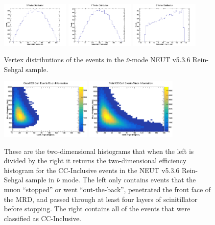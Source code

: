 \documentclass[11pt]{article}
\begin{document}
\begin{figure}[H]
\centering
\includegraphics[width=0.3\textwidth]{NewANMReinSehgalImages/4-XVertexDistributionANMRS.png}
\includegraphics[width=0.3\textwidth]{NewANMReinSehgalImages/3-YVertexDistributionANMRS.png}
\includegraphics[width=0.3\textwidth]{NewANMReinSehgalImages/2-ZVertexDistributionANMRS.png}
\caption{Vertex distributions of the events in the $\bar{\nu}$-mode NEUT v5.3.6 Rein-Sehgal sample.}
\label{fig:app:ANMVertexDistributionRS}
\end{figure}

\begin{figure}[H]
\centering
\includegraphics[width=0.4\textwidth]{NewANMReinSehgalImages/6-GoodCCCohMuonInfoANMRS.png}
\includegraphics[width=0.4\textwidth]{NewANMReinSehgalImages/9-TotalCCCohMuonInfoANMRS.png}
\caption{These are the two-dimensional histograms that when the left is divided by the right it returns the two-dimensional efficiency histogram for the CC-Inclusive events in the NEUT v5.3.6 Rein-Sehgal sample in $\bar{\nu}$ mode. The left only contains events that the muon ``stopped'' or went ``out-the-back'', penetrated the front face of the MRD, and passed through at least four layers of scinitillator before stopping. The right contains all of the events that were classified as CC-Inclusive.}
\label{fig:app:ANMCCInclusiveMuon2DRS}
\end{figure}
\end{document}
